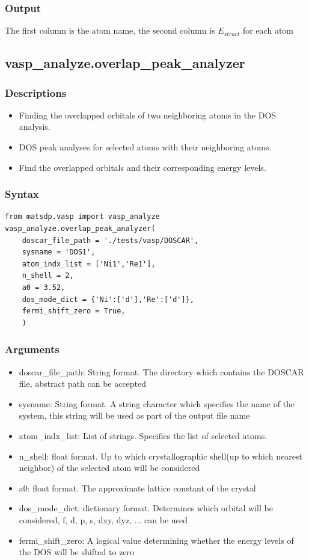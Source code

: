 \documentclass[12pt]{book}
\begin{document}
\subsubsection{Output}

The first column is the atom name, the second column is $E_{struct}$ for each atom


\subsection{vasp\_analyze.overlap\_peak\_analyzer}
\subsubsection{Descriptions}
\begin{itemize}
\item Finding the overlapped orbitals of two neighboring atoms in the DOS analysis.
\item DOS peak analyses for selected atoms with their neighboring atoms.
\item Find the overlapped orbitals and their corresponding energy levels.	
\end{itemize}

\subsubsection{Syntax}
\begin{lstlisting}
from matsdp.vasp import vasp_analyze
vasp_analyze.overlap_peak_analyzer(
    doscar_file_path = './tests/vasp/DOSCAR',
    sysname = 'DOS1',
    atom_indx_list = ['Ni1','Re1'],
    n_shell = 2,
    a0 = 3.52,
    dos_mode_dict = {'Ni':['d'],'Re':['d']},
    fermi_shift_zero = True,
    )
\end{lstlisting}

\subsubsection{Arguments}
\begin{itemize}
\item doscar\_file\_path: String format. The directory which contains the DOSCAR file, abstract path can be accepted
\item sysname: String format. A string character which specifies the name of the system, this string will be used as part of the output file name
\item atom\_indx\_list: List of strings. Specifies the list of selected atoms.
\item n\_shell: float format. Up to which crystallographic shell(up to which nearest neighbor) of the selected atom will be considered
\item a0: float format. The approximate lattice constant of the crystal
\item dos\_mode\_dict: dictionary format. Determines which orbital will be considered, f, d, p, s, dxy, dyz, ... can be used
\item fermi\_shift\_zero: A logical value determining whether the energy levels of the DOS will be shifted to zero
\end{itemize}
\end{document}
